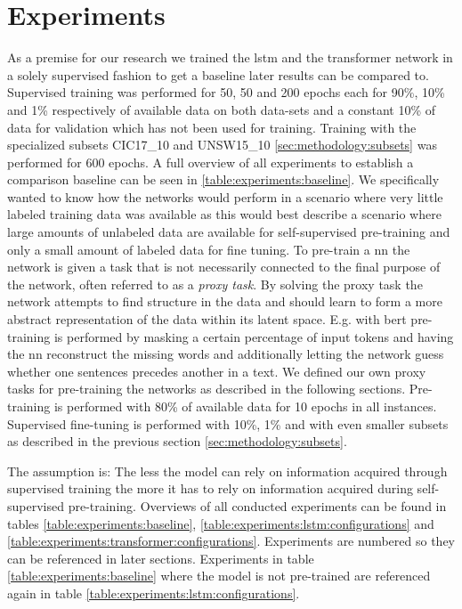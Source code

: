 \chapter{Experiments}\label{sec:experiments}


As a premise for our research we trained the \gls{lstm} and the transformer network in a solely supervised fashion to get a baseline later results can be compared to. Supervised training was performed for 50, 50 and 200 epochs each for 90\%, 10\% and 1\% respectively of available data on both data-sets and a constant 10\% of data for validation which has not been used for training. Training with the specialized subsets CIC17\_10 and UNSW15\_10 \ref{sec:methodology:subsets} was performed for 600 epochs. A full overview of all experiments to establish a comparison baseline can be seen in \ref{table:experiments:baseline}. We specifically wanted to know how the networks would perform in a scenario where very little labeled training data was available as this would best describe a scenario where large amounts of unlabeled data are available for self-supervised pre-training and only a small amount of labeled data for fine tuning. To pre-train a \gls{nn} the network is given a task that is not necessarily connected to the final purpose of the network, often referred to as a \textit{proxy task}. By solving the proxy task the network attempts to find structure in the data and should learn to form a more abstract representation of the data within its latent space. E.g. with \gls{bert} pre-training is performed by masking a certain percentage of input tokens and having the \gls{nn} reconstruct the missing words and additionally letting the network guess whether one sentences precedes another in a text. We defined our own proxy tasks for pre-training the networks as described in the following sections. Pre-training is performed with 80\% of available data for 10 epochs in all instances. Supervised fine-tuning is performed with 10\%, 1\% and with even smaller subsets as described in the previous section \ref{sec:methodology:subsets}. \par
The assumption is: The less the model can rely on information acquired through supervised training the more it has to rely on information acquired during self-supervised pre-training. Overviews of all conducted experiments can be found in tables \ref{table:experiments:baseline}, \ref{table:experiments:lstm:configurations} and \ref{table:experiments:transformer:configurations}.
Experiments are numbered so they can be referenced in later sections. Experiments in table \ref{table:experiments:baseline} where the model is not pre-trained are referenced again in table \ref{table:experiments:lstm:configurations}.

